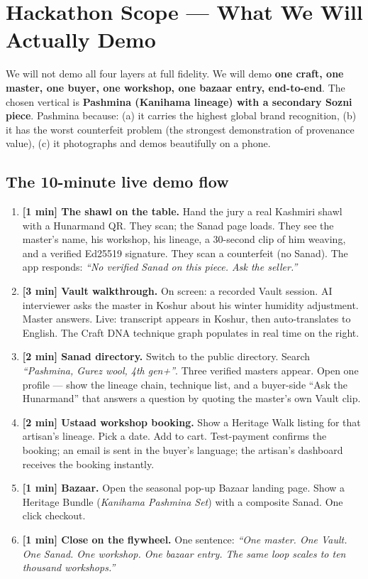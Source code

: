 \documentclass[11pt, a4paper]{article}
\begin{document}
\section{Hackathon Scope --- What We Will Actually Demo}

We will not demo all four layers at full fidelity. We will demo \textbf{one craft, one master, one buyer, one workshop, one bazaar entry, end-to-end}. The chosen vertical is \textbf{Pashmina (Kanihama lineage) with a secondary Sozni piece}. Pashmina because: (a) it carries the highest global brand recognition, (b) it has the worst counterfeit problem (the strongest demonstration of provenance value), (c) it photographs and demos beautifully on a phone.

\subsection{The 10-minute live demo flow}

\begin{enumerate}
  \item \textbf{[1 min] The shawl on the table.} Hand the jury a real Kashmiri shawl with a Hunarmand QR. They scan; the Sanad page loads. They see the master's name, his workshop, his lineage, a 30-second clip of him weaving, and a verified Ed25519 signature. They scan a counterfeit (no Sanad). The app responds: {\itshape ``No verified Sanad on this piece. Ask the seller.''}
  \item \textbf{[3 min] Vault walkthrough.} On screen: a recorded Vault session. AI interviewer asks the master in Koshur about his winter humidity adjustment. Master answers. Live: transcript appears in Koshur, then auto-translates to English. The Craft DNA technique graph populates in real time on the right.
  \item \textbf{[2 min] Sanad directory.} Switch to the public directory. Search {\itshape ``Pashmina, Gurez wool, 4th gen+''}. Three verified masters appear. Open one profile --- show the lineage chain, technique list, and a buyer-side ``Ask the Hunarmand'' that answers a question by quoting the master's own Vault clip.
  \item \textbf{[2 min] Ustaad workshop booking.} Show a Heritage Walk listing for that artisan's lineage. Pick a date. Add to cart. Test-payment confirms the booking; an email is sent in the buyer's language; the artisan's dashboard receives the booking instantly.
  \item \textbf{[1 min] Bazaar.} Open the seasonal pop-up Bazaar landing page. Show a Heritage Bundle (\textit{Kanihama Pashmina Set}) with a composite Sanad. One click checkout.
  \item \textbf{[1 min] Close on the flywheel.} One sentence: {\itshape ``One master. One Vault. One Sanad. One workshop. One bazaar entry. The same loop scales to ten thousand workshops.''}
\end{enumerate}
\end{document}
